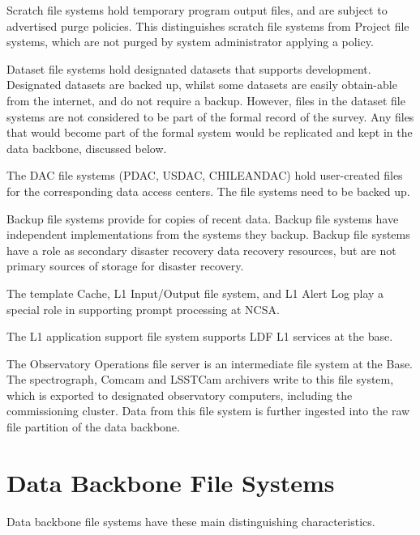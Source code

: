 \documentclass[toc,DM,lsstdraft]{lsstdoc}
\begin{document}
Scratch file systems hold temporary program output files, and are
subject to advertised purge policies. This distinguishes scratch file
systems from Project file systems, which are not purged by system
administrator applying a policy.

Dataset file systems hold designated datasets that supports development.
Designated datasets are backed up, whilst some datasets are easily obtain-able
from the internet, and do not require a backup. However, files in the
dataset file systems are not considered to be part of the formal record of
the survey. Any files that would become part of the formal system would
be replicated and kept in the data backbone, discussed below.

The DAC file systems (PDAC, USDAC, CHILEANDAC) hold user-created files
for the corresponding data access centers. The file systems need to be
backed up.

Backup file systems provide for copies of recent data. Backup file
systems have independent implementations from the systems they backup.
Backup file systems have a role as secondary disaster recovery data
recovery resources, but are not primary sources of storage for disaster
recovery.

The template Cache, L1 Input/Output file system, and L1 Alert Log
play a special role in supporting prompt processing at NCSA.

The L1 application support file system supports LDF L1 services at the
base.

The Observatory Operations file server is an intermediate file system at
the Base. The spectrograph, Comcam and LSSTCam archivers write to this file
system, which is exported to designated observatory computers, including
the commissioning cluster. Data from this file system is further ingested
into the raw file partition of the data backbone.

\section{Data Backbone File Systems}

Data backbone file systems  have these main distinguishing
characteristics.
\end{document}
